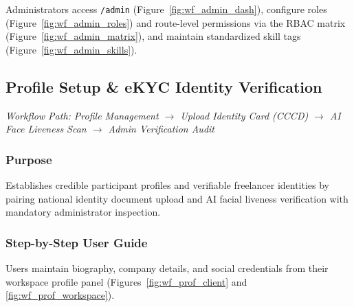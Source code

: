

Administrators access \texttt{/admin} (Figure~\ref{fig:wf_admin_dash}), configure roles (Figure~\ref{fig:wf_admin_roles}) and route-level permissions via the RBAC matrix (Figure~\ref{fig:wf_admin_matrix}), and maintain standardized skill tags (Figure~\ref{fig:wf_admin_skills}).





\subsection{Profile Setup \& eKYC Identity Verification}
\noindent\textit{Workflow Path: Profile Management $\rightarrow$ Upload Identity Card (CCCD) $\rightarrow$ AI Face Liveness Scan $\rightarrow$ Admin Verification Audit}

\subsubsection{Purpose}
Establishes credible participant profiles and verifiable freelancer identities by pairing national identity document upload and AI facial liveness verification with mandatory administrator inspection.

\subsubsection{Step-by-Step User Guide}

Users maintain biography, company details, and social credentials from their workspace profile panel (Figures~\ref{fig:wf_prof_client} and \ref{fig:wf_prof_workspace}).

